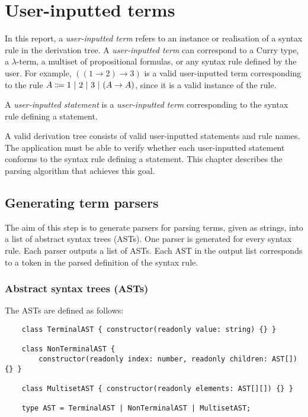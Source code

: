 \chapter{User-inputted terms}
\label{chapter:term}
In this report, a \textit{user-inputted term} refers to an instance or realisation of a syntax rule in the derivation tree. A \textit{user-inputted term} can correspond to a Curry type, a $\lambda$-term, a multiset of propositional formulas, or any syntax rule defined by the user. For example, $((1 \to 2) \to 3)$ is a valid user-inputted term corresponding to the rule $A \Coloneqq 1 \ |\  2 \ |\  3 \ |\  (A \to A)$, since it is a valid instance of the rule.

A \textit{user-inputted statement} is a \textit{user-inputted term} corresponding to the syntax rule defining a statement.

A valid derivation tree consists of valid user-inputted statements and rule names. The application must be able to verify whether each user-inputted statement conforms to the syntax rule defining a statement. This chapter describes the parsing algorithm that achieves this goal.

\section{Generating term parsers}
The aim of this step is to generate parsers for parsing terms, given as strings, into a list of abstract syntax trees (ASTs). One parser is generated for every syntax rule. Each parser outputs a list of ASTs. Each AST in the output list corresponds to a token in the parsed definition of the syntax rule.

\subsection{Abstract syntax trees (ASTs)}
The ASTs are defined as follows:
\begin{lstlisting}
    class TerminalAST { constructor(readonly value: string) {} }

    class NonTerminalAST {
        constructor(readonly index: number, readonly children: AST[]) {} }

    class MultisetAST { constructor(readonly elements: AST[][]) {} }

    type AST = TerminalAST | NonTerminalAST | MultisetAST;
\end{lstlisting}

